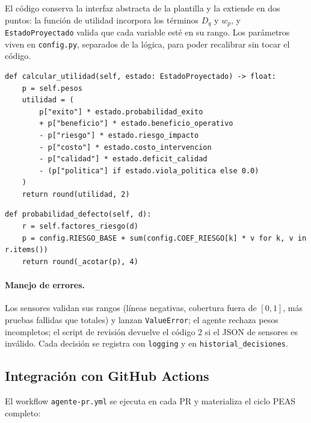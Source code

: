 \documentclass[11pt,a4paper]{article}
\newcommand{\Pdef}{P_{\text{def}}}
\begin{document}
El código conserva la interfaz abstracta de la plantilla y la extiende en dos puntos: la función de
utilidad incorpora los términos $D_q$ y $w_p$, y \texttt{EstadoProyectado} valida que cada variable
esté en su rango. Los parámetros viven en \texttt{config.py}, separados de la lógica, para poder
recalibrar sin tocar el código.

\begin{lstlisting}[caption={Función de utilidad (\texttt{base.py}).}]
def calcular_utilidad(self, estado: EstadoProyectado) -> float:
    p = self.pesos
    utilidad = (
        p["exito"] * estado.probabilidad_exito
        + p["beneficio"] * estado.beneficio_operativo
        - p["riesgo"] * estado.riesgo_impacto
        - p["costo"] * estado.costo_intervencion
        - p["calidad"] * estado.deficit_calidad
        - (p["politica"] if estado.viola_politica else 0.0)
    )
    return round(utilidad, 2)
\end{lstlisting}

\begin{lstlisting}[caption={Modelo de riesgo $\Pdef(s)$ (\texttt{agente.py}).}]
def probabilidad_defecto(self, d):
    r = self.factores_riesgo(d)
    p = config.RIESGO_BASE + sum(config.COEF_RIESGO[k] * v for k, v in r.items())
    return round(_acotar(p), 4)
\end{lstlisting}

\paragraph{Manejo de errores.} Los sensores validan sus rangos (líneas negativas, cobertura fuera de
$[0,1]$, más pruebas fallidas que totales) y lanzan \texttt{ValueError}; el agente rechaza pesos
incompletos; el script de revisión devuelve el código 2 si el JSON de sensores es inválido. Cada
decisión se registra con \texttt{logging} y en \texttt{historial\_decisiones}.

\subsection{Integración con GitHub Actions}

El workflow \texttt{agente-pr.yml} se ejecuta en cada PR y materializa el ciclo PEAS completo:
\end{document}
